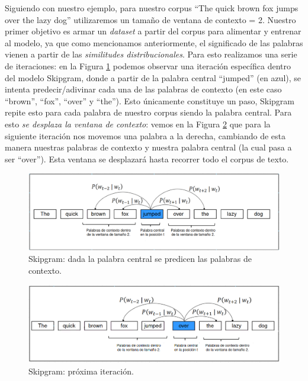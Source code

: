 \documentclass[12pt,a4paper]{article}
\begin{document}
\begin{sloppypar}
Siguiendo con nuestro ejemplo, para nuestro corpus “The quick brown fox jumps over the lazy dog” utilizaremos un tamaño de ventana de contexto = 2.  Nuestro primer objetivo es armar un \textit{dataset} a partir del corpus para alimentar y entrenar al modelo, ya que como mencionamos anteriormente, el significado de las palabras vienen a partir de las \textit{similitudes distribucionales}. Para esto realizamos una serie de iteraciones: en la Figura \ref{fig:Imagen_NLP_19} podemos observar una iteración específica dentro del modelo Skipgram, donde a partir de la palabra central “jumped” (en azul), se intenta predecir/adivinar cada una de las palabras de contexto (en este caso “brown”, “fox”, “over” y “the”).  Esto únicamente constituye un paso, Skipgram repite esto para cada palabra de nuestro corpus siendo la palabra central. Para esto \textit{se desplaza la ventana de contexto}: vemos en la Figura \ref{fig:Imagen_NLP_20}  que para la siguiente iteración nos movemos una palabra a la derecha, cambiando de esta manera nuestras palabras de contexto y nuestra palabra central (la cual pasa a ser “over”). Esta ventana se desplazará hasta recorrer todo el corpus de texto.

\begin{figure}[H]    
 \centering
 \includegraphics[width=1\textwidth]{images/NLP/19.png}
 \captionsetup{justification=centering,margin=3cm}
 \caption{Skipgram: dada la palabra central se predicen las palabras de contexto.}
 \label{fig:Imagen_NLP_19}
\end{figure}

\begin{figure}[H]    
 \centering
 \includegraphics[width=1\textwidth]{images/NLP/20.png}
 \caption{Skipgram: próxima iteración.}
 \label{fig:Imagen_NLP_20}
\end{figure}


\end{sloppypar}
\end{document}
